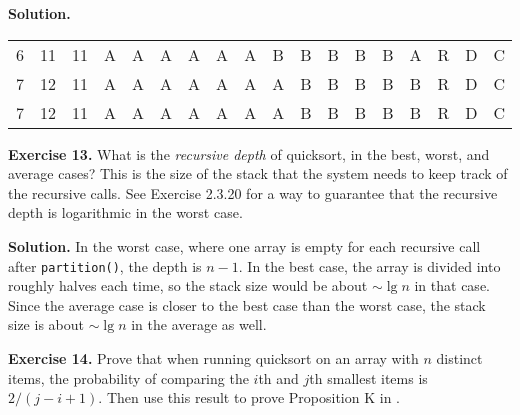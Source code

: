 \documentclass[12pt, a4paper]{article}
\newenvironment{ex}[2][Exercise]
{\par\medskip\noindent \textbf{#1 #2.}}
{\medskip}
\newenvironment{sol}[1][Solution]
{\par\medskip\noindent \textbf{#1.} }
{\medskip}
\begin{document}
\begin{sol}
\begin{center}
\begin{tabular}{ccc|ccccccccccccccc}
				6 & 11 & 11 &
				{\color{gray}A} & {\color{gray}A} & {\color{gray}A} & {\color{gray}A} & {\color{gray}A} & {\color{gray}A} & {\color{black}B} & {\color{gray}B} & {\color{gray}B} & {\color{gray}B} & {\color{gray}B} & {\color{red}A} & {\color{gray}R} & {\color{gray}D} & {\color{gray}C} \\
				
				7 & 12 & 11 &
				{\color{gray}A} & {\color{gray}A} & {\color{gray}A} & {\color{gray}A} & {\color{gray}A} & {\color{gray}A} & {\color{gray}A} & {\color{black}B} & {\color{gray}B} & {\color{gray}B} & {\color{gray}B} & {\color{black}B} & {\color{red}R} & {\color{gray}D} & {\color{gray}C} \\
				
				7 & 12 & 11 &
				{\color{black}A} & {\color{black}A} & {\color{black}A} & {\color{black}A} & {\color{black}A} & {\color{black}A} & {\color{black}A} & {\color{red}B} & {\color{red}B} & {\color{red}B} & {\color{red}B} & {\color{red}B} & {\color{black}R} & {\color{black}D} & {\color{black}C} \\
			\end{tabular}
		\end{center}
	\end{sol}
	\begin{ex}{13}
		What is the \emph{recursive depth} of quicksort, in the best, worst, and average cases?
		This is the size of the stack that the system needs to keep track of the recursive
		calls. See Exercise 2.3.20 for a way to guarantee that the recursive depth is logarithmic
		in the worst case.
	\end{ex}
	\begin{sol}
		In the worst case, where one array is empty for each recursive call
		after \texttt{partition()}, the depth is $n-1$. In the best case, the array
		is divided into roughly halves each time, so the stack size would be about
		$\sim \lg n$ in that case. Since the average case is closer to the best case
		than the worst case, the stack size is about $\sim \lg n$ in the average as well.
	\end{sol}
	\begin{ex}{14}
		Prove that when running quicksort on an array with $n$ distinct items, the probability
		of comparing the $i$th and $j$th smallest items is $2/(j-i+1)$. Then use this result
		to prove Proposition K in \cite{sedgewick_wayne}.
	\end{ex}
\end{document}

